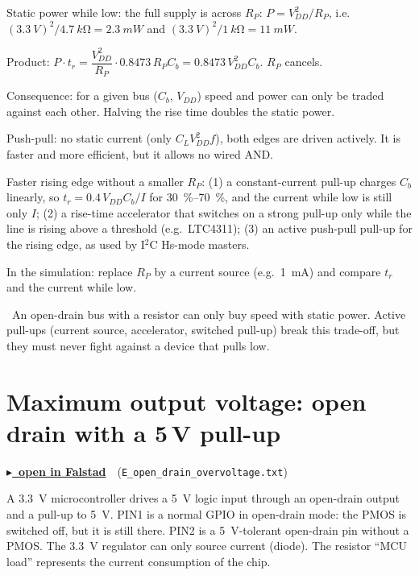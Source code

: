 \documentclass[a4paper,11pt]{article}
\newenvironment{solution}{\begin{solbox}}{\end{solbox}}
\newcommand{\answer}{\par\smallskip{\sffamily\bfseries\color{rwuviolet}Answer:}\ }
\newcommand{\circuitlink}[2]{\href{#1}{\color{rwucyandark}\sffamily\bfseries $\blacktriangleright$\ open in Falstad}\ \ (\texttt{#2})}
\begin{document}
\begin{solution}
\begin{steps}
  \item Static power while low: the full supply is across $R_P$: $P=V_{DD}^2/R_P$, i.e.\
        $(\SI{3.3}{V})^2/\SI{4.7}{k\ohm}=\SI{2.3}{mW}$ and $(\SI{3.3}{V})^2/\SI{1}{k\ohm}=\SI{11}{mW}$.
  \item Product: $P\cdot t_r=\dfrac{V_{DD}^2}{R_P}\cdot0.8473\,R_PC_b=0.8473\,V_{DD}^2C_b$. $R_P$ cancels.
  \item Consequence: for a given bus ($C_b$, $V_{DD}$) speed and power can only be traded against each other.
        Halving the rise time doubles the static power.
  \item Push-pull: no static current (only $C_LV_{DD}^2f$), both edges are driven actively. It is faster and
        more efficient, but it allows no wired AND.
  \item Faster rising edge without a smaller $R_P$: (1) a constant-current pull-up charges $C_b$ linearly, so
        $t_r=0.4\,V_{DD}C_b/I$ for \SIrange{30}{70}{\percent}, and the current while low is still only $I$;
        (2) a rise-time accelerator that switches on a strong pull-up only while the line is rising above a
        threshold (e.g.\ LTC4311); (3) an active push-pull pull-up for the rising edge, as used by I$^2$C Hs-mode
        masters.
  \item In the simulation: replace $R_P$ by a current source (e.g.\ \SI{1}{mA}) and compare $t_r$ and the current
        while low.
\end{steps}
\answer An open-drain bus with a resistor can only buy speed with static power. Active pull-ups (current source,
accelerator, switched pull-up) break this trade-off, but they must never fight against a device that pulls low.
\end{solution}

\needspace{0.45\textheight}
\section{Maximum output voltage: open drain with a 5\,V pull-up}\label{sec:overvoltage}
\circuitlink{\linkE}{E\_open\_drain\_overvoltage.txt}

A \SI{3.3}{V} microcontroller drives a \SI{5}{V} logic input through an open-drain output and a pull-up to
\SI{5}{V}. PIN1 is a normal GPIO in open-drain mode: the PMOS is switched off, but it is still there. PIN2 is a
\SI{5}{V}-tolerant open-drain pin without a PMOS. The \SI{3.3}{V} regulator can only source current (diode).
The resistor ``MCU load'' represents the current consumption of the chip.
\end{document}
